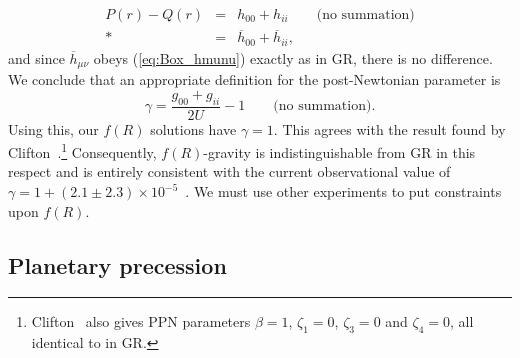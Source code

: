 \documentclass[aps,prd,amsfonts,amssymb,amsmath,nofootinbib,reprint,showpacs]{revtex4-1}
\newcommand{\eqnref}[1]{(\ref{eq:#1})}
\begin{document}
\begin{eqnarray}
P(r) - Q(r) & = & h_{00} + h_{ii} \qquad \text{(no summation)}\nonumber \\*
 & = & \overline{h}_{00} + \overline{h}_{ii},
\end{eqnarray}
and since $\overline{h}_{\mu\nu}$ obeys \eqnref{Box_hmunu} exactly as in GR, there is no difference. We conclude that an appropriate definition for the post-Newtonian parameter is
\begin{equation}
\gamma = \frac{g_{00} + g_{ii}}{2U} - 1 \qquad \text{(no summation)}.
\end{equation}
Using this, our $f(R)$ solutions have $\gamma = 1$. This agrees with the result found by Clifton~\cite{Clifton2008}.\footnote{Clifton~\cite{Clifton2008} also gives PPN parameters $\beta = 1$, $\zeta_1 = 0$, $\zeta_3 = 0$ and $\zeta_4 = 0$, all identical to in GR.} Consequently, $f(R)$-gravity is indistinguishable from GR in this respect and is entirely consistent with the current observational value of $\gamma = 1 + (2.1 \pm 2.3) \times 10^{-5}$~\cite{Will2006, Bertotti2003}. We must use other experiments to put constraints upon $f(R)$.

\subsection{Planetary precession}
\end{document}
